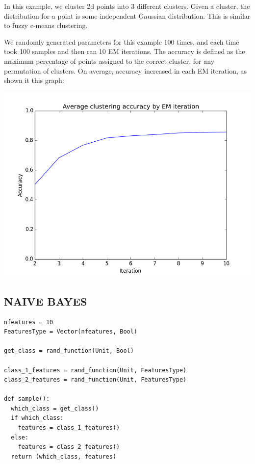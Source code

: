 \documentclass[proceed]{article}
\begin{document}
In this example, we cluster 2d points into 3 different clusters.  Given a cluster, the distribution for a point is some independent Gaussian distribution.  This is similar to fuzzy c-means clustering.

We randomly generated parameters for this example 100 times, and each time took 100 samples and then ran 10 EM iterations.  The accuracy is defined as the maximum percentage of points assigned to the correct cluster, for any permutation of clusters.  On average, accuracy increased in each EM iteration, as shown it this graph:

\begin{center}
\includegraphics[scale=0.4]{cluster_accuracy.png}
\end{center}

\subsection{NAIVE BAYES}

{\small
\begin{verbatim}
nfeatures = 10
FeaturesType = Vector(nfeatures, Bool)

get_class = rand_function(Unit, Bool)

class_1_features = rand_function(Unit, FeaturesType)
class_2_features = rand_function(Unit, FeaturesType)

def sample():
  which_class = get_class()
  if which_class:
    features = class_1_features()
  else:
    features = class_2_features()
  return (which_class, features)
\end{verbatim}
}
\end{document}
